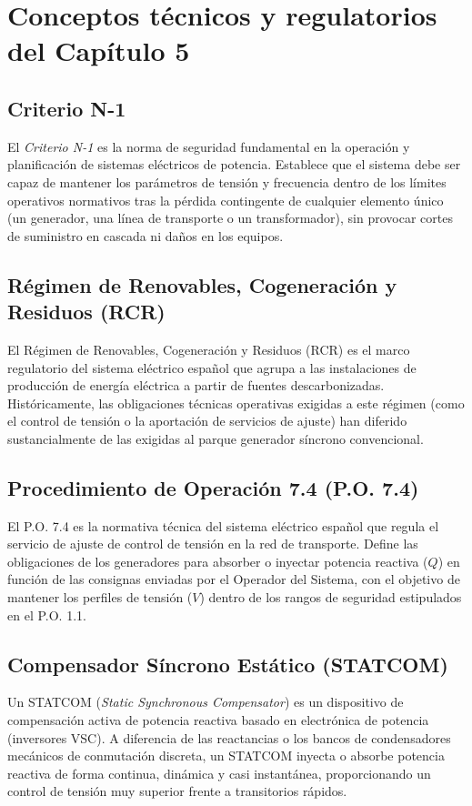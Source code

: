 
\chapter{Conceptos técnicos y regulatorios del Capítulo 5}
\label{anexo:conceptos_cap5}

\section{Criterio N-1}
\label{anexo:criterio_n1}
El \textit{Criterio N-1} es la norma de seguridad fundamental en la operación y planificación de sistemas eléctricos de potencia. Establece que el sistema debe ser capaz de mantener los parámetros de tensión y frecuencia dentro de los límites operativos normativos tras la pérdida contingente de cualquier elemento único (un generador, una línea de transporte o un transformador), sin provocar cortes de suministro en cascada ni daños en los equipos.

\section{Régimen de Renovables, Cogeneración y Residuos (RCR)}
\label{anexo:rcr}
El Régimen de Renovables, Cogeneración y Residuos (RCR) es el marco regulatorio del sistema eléctrico español que agrupa a las instalaciones de producción de energía eléctrica a partir de fuentes descarbonizadas. Históricamente, las obligaciones técnicas operativas exigidas a este régimen (como el control de tensión o la aportación de servicios de ajuste) han diferido sustancialmente de las exigidas al parque generador síncrono convencional.

\section{Procedimiento de Operación 7.4 (P.O. 7.4)}
\label{anexo:po74}
El P.O. 7.4 es la normativa técnica del sistema eléctrico español que regula el servicio de ajuste de control de tensión en la red de transporte. Define las obligaciones de los generadores para absorber o inyectar potencia reactiva ($Q$) en función de las consignas enviadas por el Operador del Sistema, con el objetivo de mantener los perfiles de tensión ($V$) dentro de los rangos de seguridad estipulados en el P.O. 1.1.

\section{Compensador Síncrono Estático (STATCOM)}
\label{anexo:statcom}
Un STATCOM (\textit{Static Synchronous Compensator}) es un dispositivo de compensación activa de potencia reactiva basado en electrónica de potencia (inversores VSC). A diferencia de las reactancias o los bancos de condensadores mecánicos de conmutación discreta, un STATCOM inyecta o absorbe potencia reactiva de forma continua, dinámica y casi instantánea, proporcionando un control de tensión muy superior frente a transitorios rápidos.

